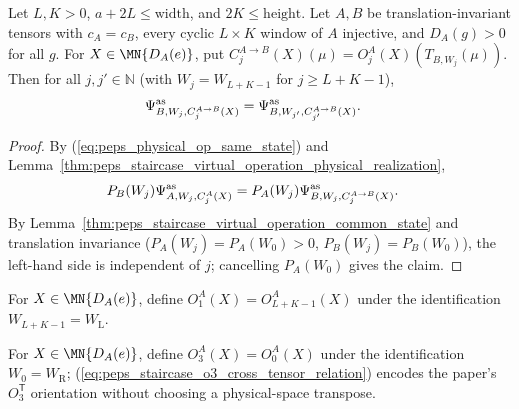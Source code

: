 \begin{lemma}%
    \label{thm:peps_staircase_physical_operation_same_state}
    \leanok
    Let $L,K>0$, $a+2L\leq\mathrm{width}$, and $2K\leq\mathrm{height}$. Let
    $A,B$ be translation-invariant tensors with $c_A=c_B$, every cyclic
    $L\times K$ window of $A$ injective, and $D_A(g)>0$ for all $g$. For
    $X\in\MN{D_A(e)}$, put
    $C_j^{A\to B}(X)(\mu)=O_j^A(X)(T_{B,W_j}(\mu))$. Then for all
    $j,j'\in\mathbb{N}$ (with $W_j=W_{L+K-1}$ for $j\geq L+K-1$),
    \begin{align}
        \Psi^{\mathrm{as}}_{B,W_j,C_j^{A\to B}(X)}
         & =\Psi^{\mathrm{as}}_{B,W_{j'},C_{j'}^{A\to B}(X)}.
        \notag
    \end{align}
\end{lemma}
\begin{proof}
    \leanok
    By (\ref{eq:peps_physical_op_same_state}) and
    Lemma~\ref{thm:peps_staircase_virtual_operation_physical_realization},
    \begin{align}
        P_B(W_j)\Psi^{\mathrm{as}}_{A,W_j,C_j^A(X)}
         & =P_A(W_j)\Psi^{\mathrm{as}}_{B,W_j,C_j^{A\to B}(X)}.
        \notag
    \end{align}
    By Lemma~\ref{thm:peps_staircase_virtual_operation_common_state} and
    translation invariance ($P_A(W_j)=P_A(W_0)>0$, $P_B(W_j)=P_B(W_0)$), the
    left-hand side is independent of $j$; cancelling $P_A(W_0)$ gives the claim.
\end{proof}

\begin{definition}%
    \label{def:peps_staircase_O1_physical_operation}
    \leanok
    For $X\in\MN{D_A(e)}$, define $O_1^A(X)=O_{L+K-1}^A(X)$ under the
    identification $W_{L+K-1}=W_{\mathrm L}$.
\end{definition}

\begin{definition}%
    \label{def:peps_staircase_O3_physical_operation}
    \leanok
    For $X\in\MN{D_A(e)}$, define $O_3^A(X)=O_0^A(X)$ under the identification
    $W_0=W_{\mathrm R}$; (\ref{eq:peps_staircase_o3_cross_tensor_relation})
    encodes the paper's $O_3^{\mathsf T}$ orientation without choosing a
    physical-space transpose.
\end{definition}

